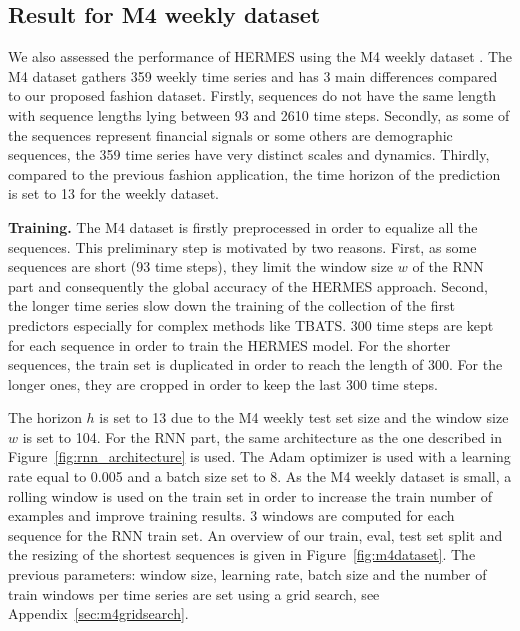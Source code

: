 \documentclass[lettersize,journal]{IEEEtran}
\begin{document}
\subsection{Result for M4 weekly dataset}

We also assessed the performance of HERMES using the M4 weekly dataset \cite{makridakis2020m4}. The M4 dataset gathers 359 weekly time series and has 3 main differences compared to our proposed fashion dataset. Firstly, sequences do not have the same length with sequence lengths lying between 93 and 2610 time steps. Secondly, as some of the sequences represent financial signals or some others are demographic sequences, the  359 time series have very distinct scales and dynamics. Thirdly, compared to the previous fashion application, the time horizon of the prediction is set to 13 for the weekly dataset. 

\textbf{Training. } The M4 dataset is firstly preprocessed in order to equalize all the sequences. This preliminary step is motivated by two reasons. First, as some sequences are short (93 time steps), they limit the window size $w$ of the RNN part and consequently the global accuracy of the HERMES approach. Second, the longer time series slow down the training of the collection of the first predictors especially for complex methods like TBATS. 300 time steps are kept for each sequence in order to train the HERMES model. For the shorter sequences, the train set is duplicated in order to reach the length of 300. For the longer ones, they are cropped in order to keep the last 300 time steps.

The horizon $h$ is set to 13 due to the M4 weekly test set size and the window size $w$ is set to 104. For the RNN part, the same architecture as the one described in Figure~\ref{fig:rnn_architecture} is used. The Adam optimizer is used with a learning rate  equal to  0.005 and a batch size set to 8. As the M4 weekly dataset is small, a rolling window is used on the train set in order to increase the train number of examples and improve training results. 3 windows are computed for each sequence for the RNN train set. An overview of our train, eval, test set split and the resizing of the shortest sequences is given in Figure~\ref{fig:m4dataset}.
The previous parameters: window size, learning rate, batch size and the number of train windows per time series are set using a grid search, see Appendix~\ref{sec:m4gridsearch}.
\end{document}
